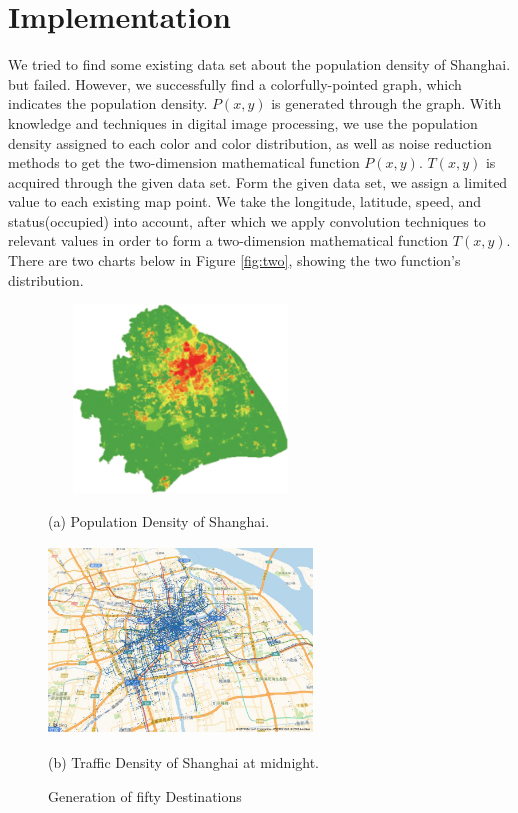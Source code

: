 \documentclass{mcmthesis}
\begin{document}
\section{Implementation}\label{sec:impl}
We tried to find some existing data set about the population density of Shanghai. but failed. However, we successfully find a colorfully-pointed graph, which indicates the population density. $P(x,y)$ is generated through the graph. With knowledge and techniques in digital image processing, we use the population density assigned to each color and color distribution, as well as noise reduction methods to get the two-dimension mathematical function $P(x,y)$. $T(x,y)$ is acquired through the given data set. Form the given data set, we assign a limited value to each existing map point. We take the longitude, latitude, speed, and status(occupied) into account, after which we apply convolution techniques to relevant values in order to form a two-dimension mathematical function $T(x,y)$. There are two charts below in Figure \ref{fig:two}, showing the two function's distribution.

\begin{figure}[htbp]
    \begin{minipage}{0.44\linewidth}
      \centerline{\includegraphics[height=5cm,width=7cm]{figures/Pd.jpg}}
      \caption*{(a) Population Density of Shanghai.}
    \end{minipage}
    \hspace{0.5in}
    \begin{minipage}{0.44\linewidth}
      \centerline{\includegraphics[height=5cm,width=7cm]{figures/Tran.png}}
      \caption*{(b) Traffic Density of Shanghai at midnight.}
    \end{minipage}
    \caption{Generation of fifty Destinations}
\end{figure}
\end{document}
